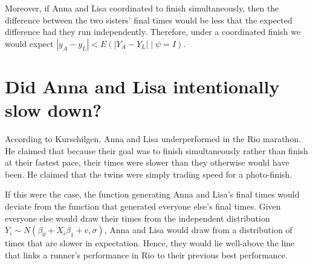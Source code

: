 \documentclass[12pt,titlepage]{article}
\begin{document}
Moreover, if Anna and Lisa coordinated to finish simultaneously, then
the difference between the two sisters' final times would be less that
the expected difference had they run independently. Therefore, under a
coordinated finish we would expect
$\left|y_A - y_L\right| < E(\left|Y_A - Y_L\right| \mid \psi = I )$.

\section*{Did Anna and Lisa intentionally slow down?}

According to Kurschilgen, Anna and Lisa underperformed in the Rio marathon. He claimed that because their goal was to finish simultaneously rather than finish at their fastest pace, their times were slower than they otherwise would have been.  He claimed that the twins were simply trading speed for a photo-finish.

If this were the case, the function generating Anna and Lisa's final times would deviate from the function that generated everyone else's final times.  Given everyone else would draw their times from the independent distribution  $Y_i \sim N(\beta_0 + X_{i}\beta_1 + e, \sigma)$,  Anna and Lisa would draw from a distribution of times that are slower in expectation. Hence, they would lie well-above the line that links a runner's performance in Rio to their previous best performance.    
\end{document}
